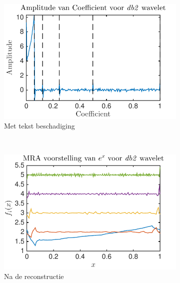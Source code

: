 \begin{figure}
\begin{subfigure}[b]{0.45\textwidth}
        \includegraphics[width=\textwidth]{../src/denoising/db2_Noise/coef_exp_db2_4_noise_10}
        \caption{Met tekst beschadiging}
        \label{fig:tiger}
    \end{subfigure}
    ~ %
    \begin{subfigure}[b]{0.45\textwidth}
        \includegraphics[width=\textwidth]{../src/denoising/db2_Noise/MRA_exp_db2_4_noise_10}
        \caption{Na de reconstructie}
        \label{fig:mouse}
    \end{subfigure}
    \begin{subfigure}[b]{0.45\textwidth}

\end{subfigure}
\end{figure}
